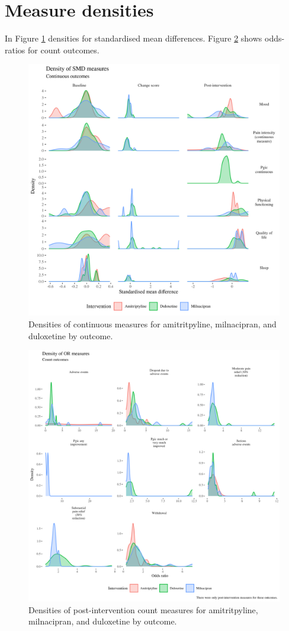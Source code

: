\documentclass{report}\usepackage[]{graphicx}\usepackage[]{color}
\begin{document}
\section{Measure densities}

In Figure \ref{fig:cspi-baseline} densities for standardised mean differences. Figure \ref{fig:dich-baseline} shows odds-ratios for count outcomes.

\begin{figure}
\includegraphics[width=\textwidth]{img/cspi-baseline.png}
\caption[Measure densities: continuous]{Densities of continuous measures for amitritpyline, milnacipran, and duloxetine by outcome.}
\label{fig:cspi-baseline}
\end{figure}


\begin{figure}
\includegraphics[width=\textwidth]{img/dich-baseline.png}
\caption[Measure densities: count]{Densities of post-intervention count measures for amitritpyline, milnacipran, and duloxetine by outcome.}
\label{fig:dich-baseline}
\end{figure}
\end{document}
